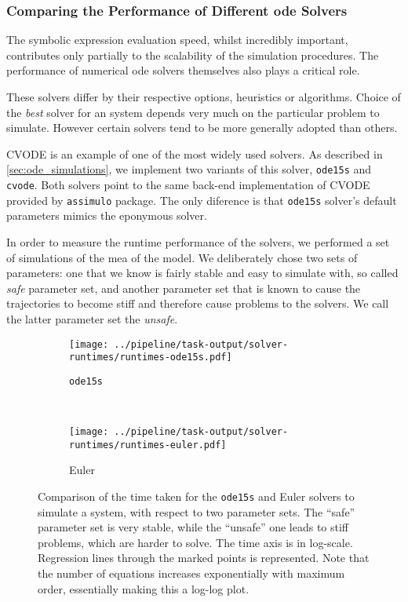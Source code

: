 \subsubsection{Comparing the Performance of Different \gls{ode} Solvers}

The symbolic expression evaluation speed, whilst incredibly important, contributes only partially to the scalability of the simulation procedures.
The performance of numerical \gls{ode} solvers themselves also plays a critical role.

These solvers differ by their respective options, heuristics or algorithms.
Choice of the \emph{best} solver for an  system depends very much on the particular problem to simulate.
However certain solvers tend to be more generally adopted than others\cite{andersson_workbench_2012}.

CVODE\cite{hindmarsh_sundials_2005} is an example of one of the most widely used solvers.
As described in \autoref{sec:ode_simulations}, we implement two variants of this solver, \verb#ode15s# and \verb#cvode#.
Both solvers point to the same back-end implementation of CVODE provided by \verb#assimulo# package\cite{andersson_christian_assimulo:_????}.
The only diference is that \verb#ode15s# solver's default parameters mimics the eponymous \mat{} solver.

In order to measure the runtime performance of the solvers, we performed a set of simulations of the \acrlong{mea} of the \pft{} model.
We deliberately chose two sets of parameters: one that we know is fairly stable and easy to simulate with, so called \emph{safe} parameter set,
and another parameter set that is known to cause the trajectories to become stiff and therefore cause problems to the solvers.
We call the latter parameter set the \emph{unsafe}.
 
\begin{figure}[tb]
   \centering
   \begin{subfigure}[t]{0.45\textwidth}
       \texttt{[image: ../pipeline/task-output/solver-runtimes/runtimes-ode15s.pdf]}
       \caption{\texttt{ode15s}}
       \label{fig:runtimes-safe-unsafe-ode15s}
   \end{subfigure}
   ~
   \begin{subfigure}[t]{0.45\textwidth}
       \texttt{[image: ../pipeline/task-output/solver-runtimes/runtimes-euler.pdf]}
       \caption{Euler}
       \label{fig:runtimes-safe-unsafe-euler}
   \end{subfigure}
   
    \caption{Comparison of the time taken for the {\tt ode15s} and Euler solvers to simulate a system, with respect to two parameter sets.
     The ``safe'' parameter set is very stable, while the ``unsafe'' one leads to stiff problems, which are harder to solve.
    The time axis is in log-scale. Regression lines through the marked points is represented.
    Note that the number of equations increases exponentially with maximum order, essentially making this a log-log plot.}
\label{fig:runtimes-safe-unsafe}
\end{figure}

